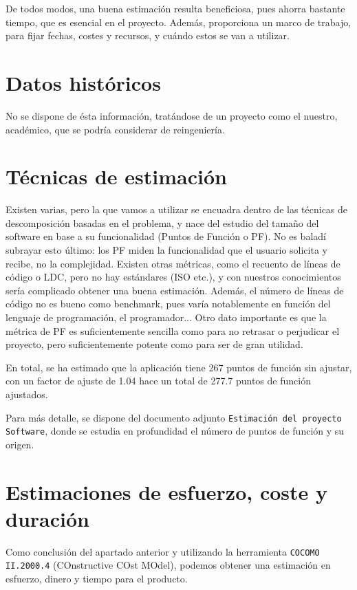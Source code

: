 \documentclass[spanish,a4paper,11pt, twoside]{report}	%
\begin{document}
		De todos modos, una buena estimación resulta beneficiosa, pues ahorra bastante
		tiempo, que es esencial en el proyecto. Además, proporciona un marco de trabajo,
		para fijar fechas, costes y recursos, y cuándo estos se van a utilizar.

	\section{Datos históricos}
		No se dispone de ésta información, tratándose de un proyecto como el nuestro,
		académico, que se podría considerar de reingeniería.

	\section{Técnicas de estimación}
		Existen varias, pero la que vamos a utilizar se encuadra dentro de las técnicas
		de descomposición basadas en el problema, y nace del estudio del tamaño del
		software en base a su funcionalidad (Puntos de Función o PF). No es baladí
		subrayar esto último: los PF miden la funcionalidad que el usuario solicita y
		recibe, no la complejidad. Existen otras métricas, como el recuento de líneas de
		código o LDC, pero no hay estándares (ISO etc.), y con nuestros conocimientos
		sería complicado obtener una buena estimación. Además, el número de líneas de
		código no es bueno como benchmark, pues varía notablemente en función del
		lenguaje de programación, el programador... Otro dato importante es que la
		métrica de PF es suficientemente sencilla como para no retrasar o perjudicar el
		proyecto, pero suficientemente potente como para ser de gran utilidad.

		En total, se ha estimado que la aplicación tiene 267 puntos de función sin ajustar, 
		con un factor de ajuste de 1.04 hace un total de 277.7 puntos de función ajustados.

		Para más detalle, se dispone del documento adjunto \texttt{Estimación del
		proyecto Software}, donde se estudia en profundidad el número de puntos de
		función y su origen.

	\section{Estimaciones de esfuerzo, coste y duración}
		Como conclusión del apartado anterior y utilizando la herramienta \texttt{COCOMO II.2000.4} (COnstructive COst MOdel), podemos obtener una estimación en esfuerzo, dinero y tiempo para el producto.
\end{document}
